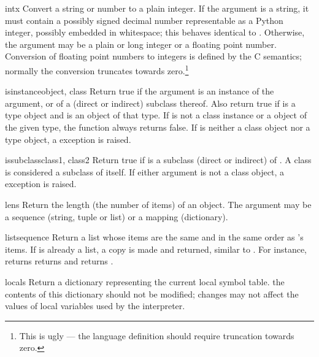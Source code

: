 \begin{funcdesc}{int}{x}
  Convert a string or number to a plain integer.  If the argument is a
  string, it must contain a possibly signed decimal number
  representable as a Python integer, possibly embedded in whitespace;
  this behaves identical to .
  Otherwise, the argument may be a plain or
  long integer or a floating point number.  Conversion of floating
  point numbers to integers is defined by the C semantics; normally
  the conversion truncates towards zero.\footnote{This is ugly --- the
  language definition should require truncation towards zero.}
\end{funcdesc}

\begin{funcdesc}{isinstance}{object, class}
Return true if the  argument is an instance of the
 argument, or of a (direct or indirect) subclass thereof.
Also return true if  is a type object and  is
an object of that type.  If  is not a class instance or a
object of the given type, the function always returns false.  If
 is neither a class object nor a type object, a
 exception is raised.
\end{funcdesc}

\begin{funcdesc}{issubclass}{class1, class2}
Return true if  is a subclass (direct or indirect) of
.  A class is considered a subclass of itself.  If either
argument is not a class object, a  exception is
raised.
\end{funcdesc}

\begin{funcdesc}{len}{s}
  Return the length (the number of items) of an object.  The argument
  may be a sequence (string, tuple or list) or a mapping (dictionary).
\end{funcdesc}

\begin{funcdesc}{list}{sequence}
Return a list whose items are the same and in the same order as
's items.  If  is already a list,
a copy is made and returned, similar to .  
For instance,  returns
returns \code{['a', 'b', 'c']} and  returns
\code{[1, 2, 3]}.
\end{funcdesc}

\begin{funcdesc}{locals}{}
Return a dictionary representing the current local symbol table.
 the contents of this dictionary should not be
modified; changes may not affect the values of local variables used by 
the interpreter.
\end{funcdesc}

